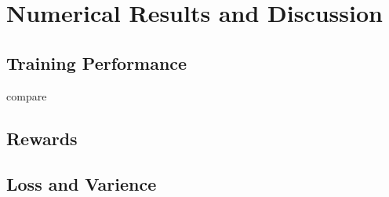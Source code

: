 
\chapter{Numerical Results and Discussion} %

\label{Chapter4} %


\section{Training Performance}
compare

\section{Rewards}

\section{Loss and Varience}